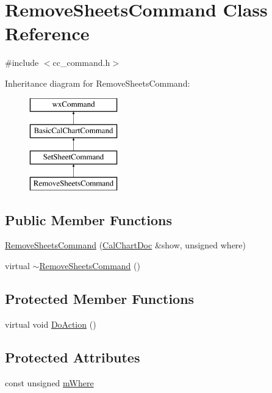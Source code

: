 \hypertarget{a00122}{\section{Remove\-Sheets\-Command Class Reference}
\label{a00122}
}


{\ttfamily \#include $<$cc\-\_\-command.\-h$>$}

Inheritance diagram for Remove\-Sheets\-Command\-:\begin{figure}[H]
\begin{center}
\leavevmode
\includegraphics[height=4.000000cm]{a00122}
\end{center}
\end{figure}
\subsection*{Public Member Functions}
\begin{DoxyCompactItemize}
\item 
\hyperlink{a00122_abebcacd05ab7ce43bd77aeede2158873}{Remove\-Sheets\-Command} (\hyperlink{a00020}{Cal\-Chart\-Doc} \&show, unsigned where)
\item 
virtual \hyperlink{a00122_a19258017dbff6c280eaf688b7a299b09}{$\sim$\-Remove\-Sheets\-Command} ()
\end{DoxyCompactItemize}
\subsection*{Protected Member Functions}
\begin{DoxyCompactItemize}
\item 
virtual void \hyperlink{a00122_ac289d6c5166a7139fa0c61c664d1710e}{Do\-Action} ()
\end{DoxyCompactItemize}
\subsection*{Protected Attributes}
\begin{DoxyCompactItemize}
\item 
const unsigned \hyperlink{a00122_a6185d54382d4a2c77c07f918c88ea97c}{m\-Where}
\end{DoxyCompactItemize}


